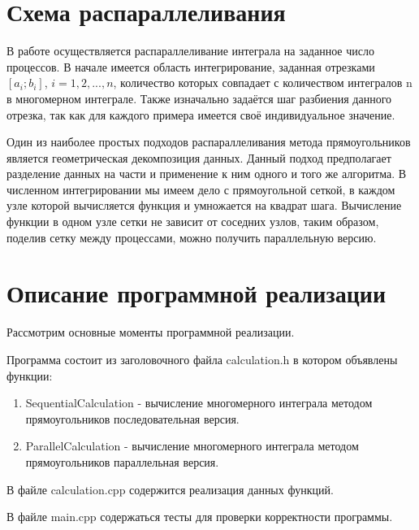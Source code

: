 \documentclass{report}
\begin{document}
\section*{Схема распараллеливания}
В работе осуществляется распараллеливание интеграла на заданное число процессов. В начале имеется область интегрирование, заданная отрезками $[a_{i}; b_{i}]$, $i = 1, 2, ..., n$, количество которых совпадает с количеством интегралов n в многомерном интеграле. Также изначально задаётся шаг разбиения данного отрезка, так как для каждого примера имеется своё индивидуальное значение.
\par Один из наиболее простых подходов распараллеливания метода прямоугольников является геометрическая декомпозиция данных. Данный подход предполагает разделение данных на части и применение к ним одного и того же алгоритма. В численном интегрировании мы имеем дело с прямоугольной сеткой, в каждом узле которой вычисляется функция и умножается на квадрат шага. Вычисление функции в одном узле сетки не зависит от соседних узлов, таким образом, поделив сетку между процессами, можно получить параллельную версию.
\newpage

\section*{Описание программной реализации}
Рассмотрим основные моменты программной реализации.
\par Программа состоит из заголовочного файла calculation.h в котором объявлены функции:
\begin{enumerate}
\item SequentialCalculation - вычисление многомерного интеграла методом прямоугольников последовательная версия.
\item ParallelCalculation - вычисление многомерного интеграла методом прямоугольников параллельная версия.
\end{enumerate}
\par В файле calculation.cpp содержится реализация данных функций.
\par В файле main.cpp содержаться тесты для проверки корректности программы.
\newpage
\end{document}
